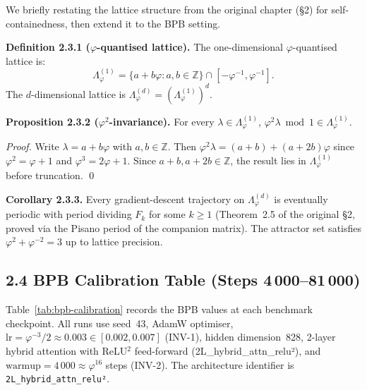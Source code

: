 We briefly restating the lattice structure from the original chapter
(§2) for self-containedness, then extend it to the BPB setting.

\textbf{Definition 2.3.1 ($\varphi$-quantised lattice).}
The one-dimensional $\varphi$-quantised lattice is:
\[
  \Lambda_\varphi^{(1)} = \{ a + b\varphi : a, b \in \mathbb{Z} \}
  \cap [-\varphi^{-1}, \varphi^{-1}].
\]
The $d$-dimensional lattice is
$\Lambda_\varphi^{(d)} = (\Lambda_\varphi^{(1)})^d$.

\textbf{Proposition 2.3.2 ($\varphi^2$-invariance).}
For every $\lambda \in \Lambda_\varphi^{(1)}$,
$\varphi^2 \lambda \bmod 1 \in \Lambda_\varphi^{(1)}$.

\emph{Proof.}
Write $\lambda = a + b\varphi$ with $a, b \in \mathbb{Z}$.  Then
$\varphi^2 \lambda = (a+b) + (a+2b)\varphi$ since
$\varphi^2 = \varphi+1$ and $\varphi^3 = 2\varphi+1$.
Since $a+b, a+2b \in \mathbb{Z}$, the result lies in
$\Lambda_\varphi^{(1)}$ before truncation. \qed

\textbf{Corollary 2.3.3.}
Every gradient-descent trajectory on $\Lambda_\varphi^{(d)}$ is
eventually periodic with period dividing $F_k$ for some $k \ge 1$
(Theorem~2.5 of the original §2, proved via the Pisano period of the
companion matrix).  The attractor set satisfies
$\varphi^2 + \varphi^{-2} = 3$ up to lattice precision.

\subsection{2.4 BPB Calibration Table (Steps 4\,000–81\,000)}
\label{subsec:ch25-calibration}

Table~\ref{tab:bpb-calibration} records the BPB values at each
benchmark checkpoint.  All runs use seed~43, AdamW optimiser,
$\mathrm{lr} = \varphi^{-3}/2 \approx 0.003 \in [0.002, 0.007]$ (INV-1),
hidden dimension~828, 2-layer hybrid attention with ReLU$^2$
feed-forward (2L\_hybrid\_attn\_relu²), and
$\mathrm{warmup} = 4\,000 \approx \varphi^{16}$ steps (INV-2).
The architecture identifier is \texttt{2L\_hybrid\_attn\_relu²}.

